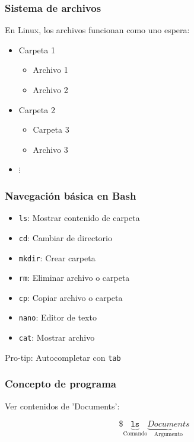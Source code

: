 \documentclass[14pt,aspectratio=169,xcolor=dvipsnames]{beamer}
\begin{document}
\begin{frame}\frametitle{Sistema de archivos}
En Linux, los archivos funcionan como uno espera:
    \begin{itemize}
        \item Carpeta 1
            \begin{itemize}
                \item Archivo 1
                \item Archivo 2
            \end{itemize}
        \item Carpeta 2
            \begin{itemize}
                \item Carpeta 3
                \item Archivo 3
            \end{itemize}
        \item $\vdots$
    \end{itemize}

\end{frame}
\begin{frame}\frametitle{Navegación básica en Bash}
    \begin{itemize}
        \item \texttt{ls}: Mostrar contenido de carpeta
        \item \texttt{cd}: Cambiar de directorio
        \item \texttt{mkdir}: Crear carpeta
        \item \texttt{rm}: Eliminar archivo o carpeta
        \item \texttt{cp}: Copiar archivo o carpeta
        \item \texttt{nano}: Editor de texto
        \item \texttt{cat}: Mostrar archivo
    \end{itemize}

\vspace{1cm} 
Pro-tip: Autocompletar con \texttt{tab}
\end{frame}
\begin{frame}[fragile]\frametitle{Concepto de programa}
Ver contenidos de 'Documents':

    $$ \texttt{\$ }\underbrace{\texttt{ls}}_\text{Comando}  \underbrace{Documents}_\text{Argumento} $$
\end{frame}
\end{document}

